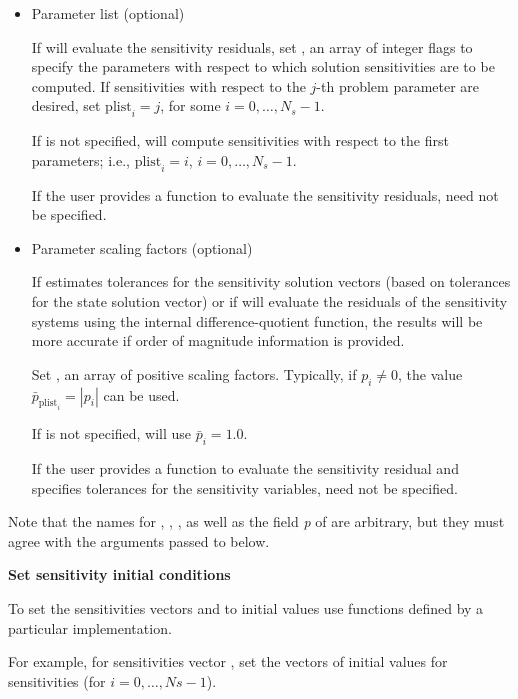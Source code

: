\begin{Steps}
\begin{itemize}
    \item Parameter list (optional)

      If {\idas} will evaluate the sensitivity residuals,
      set , an array of  integer flags to specify the 
      parameters  with respect to which solution sensitivities are to be computed.
      If sensitivities with respect to the $j$-th problem parameter are desired, set
      ${\text{plist}}_i = j$, for some $i=0,\ldots,N_s-1$.

      If  is not specified, {\idas} will compute sensitivities with respect
      to the first  parameters; i.e., ${\text{plist}}_i = i$, $i=0,\ldots,N_s-1$.

      If the user provides a function to evaluate the sensitivity residuals,
       need not be specified.

    \item Parameter scaling factors (optional)

      If {\idas} estimates tolerances for the sensitivity solution vectors (based
      on tolerances for the state solution vector) or if {\idas} will evaluate 
      the residuals of the sensitivity systems using the internal difference-quotient
      function, the results will be more accurate if order of magnitude information is provided.

      Set , an array of  positive scaling factors. Typically,
      if $p_i \ne 0$, the value ${\bar p}_{\text{plist}_i} = |p_i|$ can be used.

      If  is not specified, {\idas} will use ${\bar p}_i = 1.0$.

      If the user provides a function to evaluate the sensitivity residual and specifies
      tolerances for the sensitivity variables,  need not be specified.

    \end{itemize}

    Note that the names for , , , as well as the field
    {\em p} of  are arbitrary, but they must agree with the arguments
    passed to  below.

\item
  {\bf Set sensitivity initial conditions}

  To set the sensitivities vectors  and  to initial values
  use functions defined by a particular {\nvector} implementation. 

  For example, for sensitivities vector , set the  vectors 
   of  initial values for sensitivities (for $i=0,\ldots,Ns-1$). 


\end{Steps}
